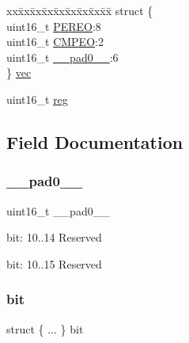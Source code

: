 \begin{DoxyCompactItemize}
\begin{tabbing}
\end{tabbing}\item 
\begin{tabbing}
xx\=xx\=xx\=xx\=xx\=xx\=xx\=xx\=xx\=\kill
struct \{\\
\>uint16\_t \mbox{\hyperlink{union_r_t_c___m_o_d_e1___e_v_c_t_r_l___type_a936998d42a0d7673dd317bdd16f1f224}{PEREO}}:8\\
\>uint16\_t \mbox{\hyperlink{union_r_t_c___m_o_d_e1___e_v_c_t_r_l___type_ad757caef95396eab9089e7558e4f706e}{CMPEO}}:2\\
\>uint16\_t \mbox{\hyperlink{union_r_t_c___m_o_d_e1___e_v_c_t_r_l___type_a77132c2c26a75f5b8751b235cda23828}{\_\_pad0\_\_}}:6\\
\} \mbox{\hyperlink{union_r_t_c___m_o_d_e1___e_v_c_t_r_l___type_a729de4c0825d657c8c2c038725bfa3be}{vec}}\\

\end{tabbing}\item 
uint16\+\_\+t \mbox{\hyperlink{union_r_t_c___m_o_d_e1___e_v_c_t_r_l___type_a11760f5020019f4aa8cb02e694f7cc44}{reg}}
\end{DoxyCompactItemize}


\subsection{Field Documentation}
\mbox{\label{union_r_t_c___m_o_d_e1___e_v_c_t_r_l___type_a77132c2c26a75f5b8751b235cda23828}} 
\subsubsection{\texorpdfstring{\_\_pad0\_\_}{\_\_pad0\_\_}}
{\footnotesize\ttfamily uint16\+\_\+t \+\_\+\+\_\+pad0\+\_\+\+\_\+}

bit\+: 10..14 Reserved

bit\+: 10..15 Reserved \mbox{\label{union_r_t_c___m_o_d_e1___e_v_c_t_r_l___type_a4573e580e4a3025553c77d051c629eca}} 
\subsubsection{\texorpdfstring{bit}{bit}}
{\footnotesize\ttfamily struct \{ ... \}   bit}

